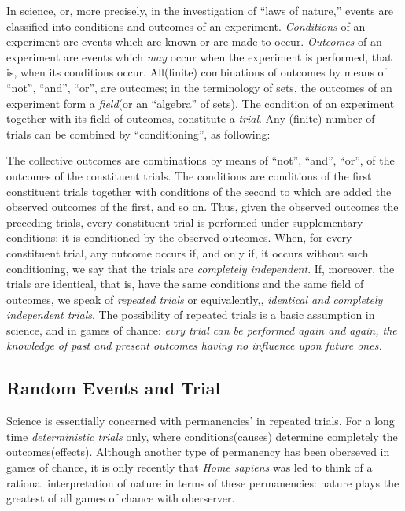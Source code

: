 \documentclass[a4paper]{article}
\begin{document}
In science, or, more precisely, in the investigation of ``laws of
nature,'' events are classified into conditions and outcomes of an
experiment. \textit{Conditions} of an experiment are events which are known or
are made to occur. \textit{Outcomes} of an experiment are events which
\textit{may} occur when the experiment is performed, that is, when its
conditions occur. All(finite) combinations of outcomes by means of
``not'', ``and'', ``or'', are outcomes; in the terminology of sets, the
outcomes of an experiment form a \textit{field}(or an ``algebra'' of
sets). The condition of an experiment together with its field of
outcomes, constitute a \textit{trial}. Any (finite) number of trials can
be combined by ``conditioning'', as following:

The collective outcomes are combinations by means of ``not'', ``and'',
``or'', of the outcomes of the constituent trials. The conditions are
conditions of the first constituent trials together with conditions of
the second to which are added the observed outcomes of the first, and so
on. Thus, given the observed outcomes the preceding trials, every
constituent trial is performed under supplementary conditions: it is
conditioned by the observed outcomes. When, for every constituent trial,
any outcome occurs if, and only if, it occurs without such conditioning,
we say that the trials are \textit{completely independent}. If,
moreover, the trials are identical, that is, have the same conditions
and the same field of outcomes, we speak of \textit{repeated trials} or
equivalently,, \textit{identical and completely independent trials}. The
possibility of repeated trials is a basic assumption in science, and in
games of chance: \textit{evry trial can be performed again and again,
the knowledge of past and present outcomes having no influence upon
future ones.}\cite{1977probability}

\subsection{Random Events and Trial}

Science is essentially concerned with  permanencies' in repeated trials.
For a long time \textit{deterministic trials} only, where
conditions(causes) determine completely the outcomes(effects). Although
another type of permanency has been oberseved in games of chance, it is
only recently that \textit{Home sapiens} was led to think of a rational
interpretation of nature in terms of these permanencies: nature plays
the greatest of all games of chance with
oberserver.\cite{1977probability}
\end{document}
